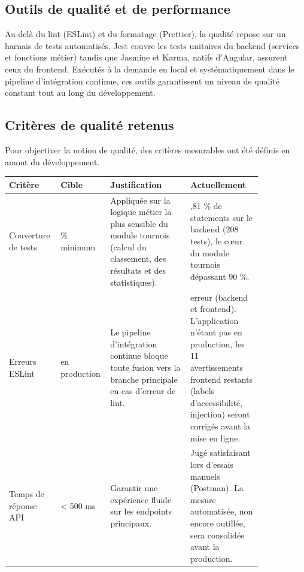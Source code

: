 \subsection{Outils de qualité et de performance}
Au-delà du lint (ESLint) et du formatage (Prettier), la qualité repose sur un harnais de tests automatisés. Jest couvre les tests unitaires du backend (services et fonctions métier) tandis que Jasmine et Karma, natifs d'Angular, assurent ceux du frontend. Exécutés à la demande en local et systématiquement dans le pipeline d'intégration continue, ces outils garantissent un niveau de qualité constant tout au long du développement.

\subsection{Critères de qualité retenus}
Pour objectiver la notion de qualité, des critères mesurables ont été définis en amont du développement.

\begin{table}[H]
    \centering
    \small
    \begin{tabular}{|>{\raggedright\arraybackslash}p{0.16\linewidth}|>{\raggedright\arraybackslash}p{0.11\linewidth}|>{\raggedright\arraybackslash}p{0.30\linewidth}|>{\raggedright\arraybackslash}p{0.27\linewidth}|}
        \hline
        \textbf{Critère} & \textbf{Cible} & \textbf{Justification} & \textbf{Actuellement} \\
        \hline
        Couverture de tests & 70 \% minimum & Appliquée sur la logique métier la plus sensible du module tournois (calcul du classement, des résultats et des statistiques). & 82,81 \% de statements sur le backend (208 tests), le cœur du module tournois dépassant 90 \%. \\
        \hline
        Erreurs ESLint & 0 en production & Le pipeline d'intégration continue bloque toute fusion vers la branche principale en cas d'erreur de lint. & 0 erreur (backend et frontend). L'application n'étant pas en production, les 11 avertissements frontend restants (labels d'accessibilité, injection) seront corrigés avant la mise en ligne. \\
        \hline
        Temps de réponse API & < 500 ms & Garantir une expérience fluide sur les endpoints principaux. & Jugé satisfaisant lors d'essais manuels (Postman). La mesure automatisée, non encore outillée, sera consolidée avant la production. \\
        \hline
    \end{tabular}
\end{table}


